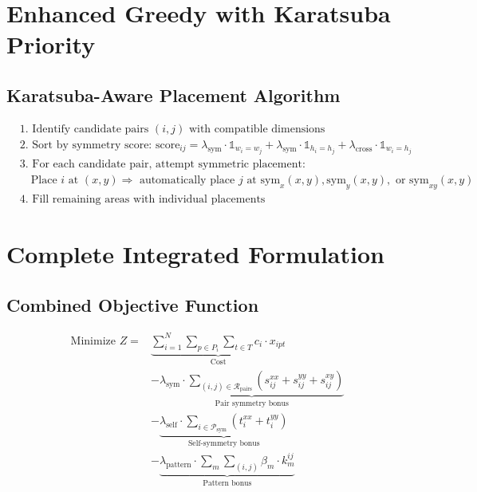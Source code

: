 \documentclass{article}
\begin{document}
\section{Enhanced Greedy with Karatsuba Priority}

\subsection{Karatsuba-Aware Placement Algorithm}
\begin{align}
&\text{1. Identify candidate pairs } (i,j) \text{ with compatible dimensions} \\
&\text{2. Sort by symmetry score: } \text{score}_{ij} = \lambda_{\text{sym}} \cdot \mathbb{1}_{w_i=w_j} + \lambda_{\text{sym}} \cdot \mathbb{1}_{h_i=h_j} + \lambda_{\text{cross}} \cdot \mathbb{1}_{w_i=h_j} \\
&\text{3. For each candidate pair, attempt symmetric placement:} \\
&\quad \text{Place } i \text{ at } (x,y) \Rightarrow \text{ automatically place } j \text{ at sym}_x(x,y), \text{sym}_y(x,y), \text{ or } \text{sym}_{xy}(x,y) \\
&\text{4. Fill remaining areas with individual placements}
\end{align}

\section{Complete Integrated Formulation}

\subsection{Combined Objective Function}
\begin{align}
\text{Minimize } Z = & \underbrace{\sum_{i=1}^{N} \sum_{p \in P_i} \sum_{t \in T} c_i \cdot x_{ipt}}_{\text{Cost}} \\
& - \underbrace{\lambda_{\text{sym}} \cdot \sum_{(i,j) \in \mathcal{R}_{\text{pairs}}} \left( s_{ij}^{xx} + s_{ij}^{yy} + s_{ij}^{xy} \right)}_{\text{Pair symmetry bonus}} \\
& - \underbrace{\lambda_{\text{self}} \cdot \sum_{i \in \mathcal{P}_{\text{sym}}} \left( t_{i}^{xx} + t_{i}^{yy} \right)}_{\text{Self-symmetry bonus}} \\
& - \underbrace{\lambda_{\text{pattern}} \cdot \sum_{m} \sum_{(i,j)} \beta_m \cdot k_{m}^{ij}}_{\text{Pattern bonus}}
\end{align}
\end{document}
